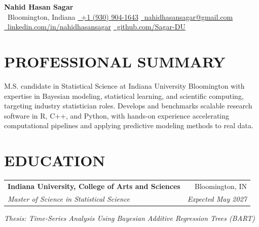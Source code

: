 \documentclass[10pt,letterpaper]{article}
\makeatletter
\newcommand{\resumeEntry}[4]{%
  \begin{tabularx}{\textwidth}{@{}Xr@{}}
    \textbf{#1} & #2 \\
    \textit{#3} & \textit{#4}
  \end{tabularx}%
}
\newcommand{\contactsep}{\qquad}
\makeatother
\begin{document}
\normalsize

\begin{center}
  {\LARGE
   \textbf{Nahid Hasan Sagar}}\\[2.2pt]

  {\footnotesize
    \faMapMarker*\, Bloomington, Indiana
    \contactsep
    \href{tel:+19309041643}{\faPhone*\, +1 (930) 904-1643}
    \contactsep
    \href{mailto:nahidhasansagar@gmail.com}{\faEnvelope\, nahidhasansagar@gmail.com}
  }\\[-0.2pt]

  {\footnotesize
    \href{https://www.linkedin.com/in/nahidhasansagar/}{\faLinkedinIn\, linkedin.com/in/nahidhasansagar}
    \contactsep
    \href{https://github.com/Sagar-DU}{\faGithub\, github.com/Sagar-DU}
  }
\end{center}

\vspace{-5pt}

\section*{PROFESSIONAL SUMMARY}

M.S. candidate in Statistical Science at Indiana University Bloomington with expertise in Bayesian modeling, statistical learning, and scientific computing, targeting
industry statistician roles. Develops and benchmarks scalable research software in R, C++, and Python, with hands-on experience
accelerating computational pipelines and applying predictive modeling methods to real data.

\section*{EDUCATION}

\resumeEntry
  {Indiana University, College of Arts and Sciences}
  {Bloomington, IN}
  {Master of Science in Statistical Science}
  {Expected May 2027}

\vspace{0.4pt}

\textit{Thesis: Time-Series Analysis Using Bayesian Additive Regression
Trees (BART)}
\end{document}

